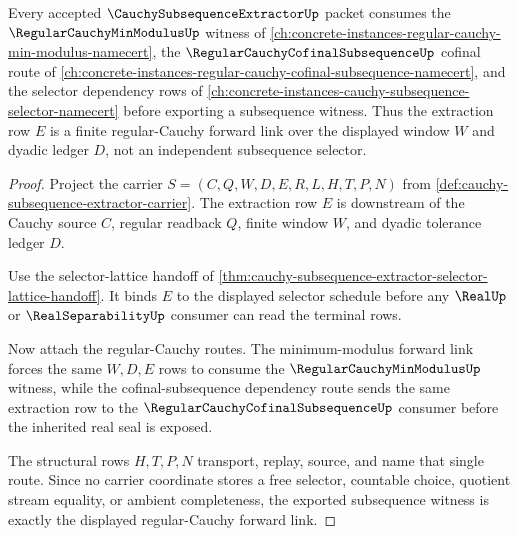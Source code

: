 \begin{theorem}
\label{thm:cauchy-subsequence-extractor-regular-cauchy-forward-link}
Every accepted $\CauchySubsequenceExtractorUp$ packet consumes the $\RegularCauchyMinModulusUp$ witness of \autoref{ch:concrete-instances-regular-cauchy-min-modulus-namecert}, the $\RegularCauchyCofinalSubsequenceUp$ cofinal route of \autoref{ch:concrete-instances-regular-cauchy-cofinal-subsequence-namecert}, and the selector dependency rows of \autoref{ch:concrete-instances-cauchy-subsequence-selector-namecert} before exporting a subsequence witness. Thus the extraction row $E$ is a finite regular-Cauchy forward link over the displayed window $W$ and dyadic ledger $D$, not an independent subsequence selector.
\end{theorem}
\begin{proof}
Project the carrier $S=(C,Q,W,D,E,R,L,H,T,P,N)$ from \autoref{def:cauchy-subsequence-extractor-carrier}. The extraction row $E$ is downstream of the Cauchy source $C$, regular readback $Q$, finite window $W$, and dyadic tolerance ledger $D$.

Use the selector-lattice handoff of \autoref{thm:cauchy-subsequence-extractor-selector-lattice-handoff}. It binds $E$ to the displayed selector schedule before any $\RealUp$ or $\RealSeparabilityUp$ consumer can read the terminal rows.

Now attach the regular-Cauchy routes. The minimum-modulus forward link forces the same $W,D,E$ rows to consume the $\RegularCauchyMinModulusUp$ witness, while the cofinal-subsequence dependency route sends the same extraction row to the $\RegularCauchyCofinalSubsequenceUp$ consumer before the inherited real seal is exposed.

The structural rows $H,T,P,N$ transport, replay, source, and name that single route. Since no carrier coordinate stores a free selector, countable choice, quotient stream equality, or ambient completeness, the exported subsequence witness is exactly the displayed regular-Cauchy forward link.
\end{proof}
